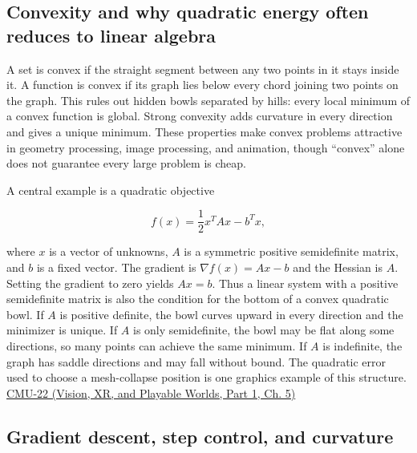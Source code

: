 \subsection{Convexity and why quadratic energy often reduces to linear algebra}\label{04-visual-computing-ii-ch029-convexity-and-why-quadratic-energy-often-reduces-to-linear-algebra}

\hypertarget{04-visual-computing-ii-ch029-convexity-and-why-quadratic-energy-often-reduces-to-linear-algebra}{}

A set is convex if the straight segment between any two points in it stays inside it. A function is convex if its graph lies below every chord joining two points on the graph. This rules out hidden bowls separated by hills: every local minimum of a convex function is global. Strong convexity adds curvature in every direction and gives a unique minimum. These properties make convex problems attractive in geometry processing, image processing, and animation, though ``convex'' alone does not guarantee every large problem is cheap.

A central example is a quadratic objective

\[
f(x)=\frac12 x^T A x-b^T x,
\]

where \(x\) is a vector of unknowns, \(A\) is a symmetric positive semidefinite matrix, and \(b\) is a fixed vector. The gradient is \(\nabla f(x)=Ax-b\) and the Hessian is \(A\). Setting the gradient to zero yields \(Ax=b\). Thus a linear system with a positive semidefinite matrix is also the condition for the bottom of a convex quadratic bowl. If \(A\) is positive definite, the bowl curves upward in every direction and the minimizer is unique. If \(A\) is only semidefinite, the bowl may be flat along some directions, so many points can achieve the same minimum. If \(A\) is indefinite, the graph has saddle directions and may fall without bound. The quadratic error used to choose a mesh-collapse position is one graphics example of this structure. \href{../07-Vision-XR-and-Playable-Worlds-P01/main.pdf\#nameddest=04-visual-computing-ii-ch036-cmu-22---optimization}{CMU-22 (Vision, XR, and Playable Worlds, Part 1, Ch. 5)}

\subsection{Gradient descent, step control, and curvature}\label{04-visual-computing-ii-ch029-gradient-descent-step-control-and-curvature}

\hypertarget{04-visual-computing-ii-ch029-gradient-descent-step-control-and-curvature}{}

